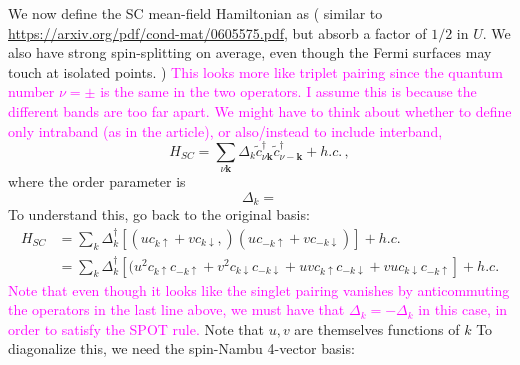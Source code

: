 \documentclass[aps,onecolumn,amsmath,amssymb,preprintnumbers,floatfix,prl,superscriptaddress,longbibliography]{revtex4-2}%
\newcommand{\hans}[1]{\textcolor{Magenta}{{#1}}}
\renewcommand\vec{\mathbf}
\begin{document}
We now define the SC mean-field Hamiltonian as ( similar to \url{https://arxiv.org/pdf/cond-mat/0605575.pdf}, but absorb a factor of $1/2$ in $U$. We also have strong spin-splitting on average, even though the Fermi surfaces may touch at isolated points. )
\hans{This looks more like triplet pairing since the quantum number $\nu = \pm$ is the same in the two operators. I assume this is because the different bands are too far apart.} \hans{We might have to think about whether to define only intraband (as in the article), or also/instead to include interband,}
\begin{equation}
    H_{SC} = \sum_{\nu \vec k} \Delta_k \tilde c^\dag_{\nu \vec k} \tilde c^\dag_{\nu -\vec k} + h.c. \, ,
\end{equation}
where the order parameter is
\begin{equation}
    \Delta_k = 
\end{equation}
To understand this, go back to the original basis:
\begin{align}
    H_{SC} &= \sum_k \Delta_k^\dag \left[(u c_{k \uparrow} + v c_{k \downarrow},) (u c_{-k \uparrow} + v c_{-k \downarrow})   \right] + h.c.
    \\
    &= \sum_k \Delta_k^\dag \left[(u^2 c_{k \uparrow}c_{-k \uparrow} + v^2 c_{k \downarrow} c_{-k \downarrow} + uv c_{k \uparrow} c_{-k \downarrow} + vu c_{k \downarrow} c_{-k \uparrow} \right] + h.c.
\end{align}
\hans{Note that even though it looks like the singlet pairing vanishes by anticommuting the operators in the last line above, we must have that $\Delta_k = - \Delta_k$ in this case, in order to satisfy the SPOT rule.}
Note that $u, v$ are themselves functions of $k$
To diagonalize this, we need the spin-Nambu 4-vector basis:
\end{document}
